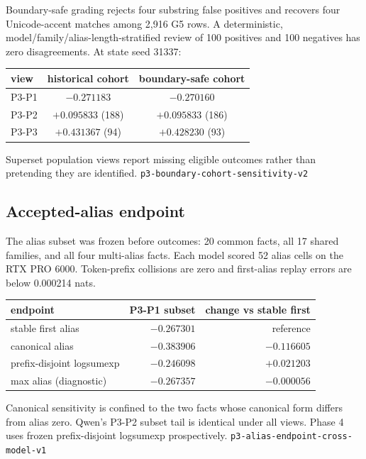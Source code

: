 \documentclass[10pt]{article}
\newcommand{\eid}[1]{\textcolor{muted}{\footnotesize\texttt{#1}}}
\begin{document}
Boundary-safe grading rejects four substring false positives and recovers
four Unicode-accent matches among 2,916 G5 rows. A deterministic,
model/family/alias-length-stratified review of 100 positives and 100
negatives has zero disagreements. At state seed 31337:

\begin{center}\small
\begin{tabular}{lcc}
\toprule
view & historical cohort & boundary-safe cohort\\
\midrule
P3-P1 & $-0.271183$ & $-0.270160$\\
P3-P2 & $+0.095833$ (188) & $+0.095833$ (186)\\
P3-P3 & $+0.431367$ (94) & $+0.428230$ (93)\\
\bottomrule
\end{tabular}
\end{center}

Superset population views report missing eligible outcomes rather than
pretending they are identified.
\eid{p3-boundary-cohort-sensitivity-v2}

\subsection{Accepted-alias endpoint}

The alias subset was frozen before outcomes: 20 common facts, all 17
shared families, and all four multi-alias facts. Each model scored 52
alias cells on the RTX PRO 6000. Token-prefix collisions are zero and
first-alias replay errors are below 0.000214 nats.

\begin{center}\small
\begin{tabular}{lrr}
\toprule
endpoint & P3-P1 subset & change vs stable first\\
\midrule
stable first alias & $-0.267301$ & reference\\
canonical alias & $-0.383906$ & $-0.116605$\\
prefix-disjoint logsumexp & $-0.246098$ & $+0.021203$\\
max alias (diagnostic) & $-0.267357$ & $-0.000056$\\
\bottomrule
\end{tabular}
\end{center}

Canonical sensitivity is confined to the two facts whose canonical form
differs from alias zero. Qwen's P3-P2 subset tail is identical under all
views. Phase 4 uses frozen prefix-disjoint logsumexp prospectively.
\eid{p3-alias-endpoint-cross-model-v1}
\end{document}
